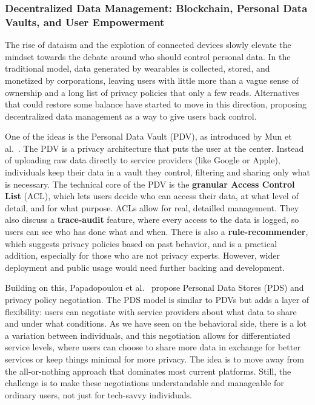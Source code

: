 	\subsubsection{Decentralized Data Management: Blockchain, Personal Data Vaults, and User Empowerment}

	The rise of dataism and the explotion of connected devices slowly elevate the mindset towards the debate around who should control personal data. In the traditional model, data generated by wearables is collected, stored, and monetized by corporations, leaving users with little more than a vague sense of ownership and a long list of privacy policies that only a few reads. Alternatives that could restore some balance have started to move in this direction, proposing decentralized data management as a way to give users back control.

	One of the ideas is the Personal Data Vault (PDV), as introduced by Mun et al.~\cite{Mun2010}. The PDV is a privacy architecture that puts the user at the center. Instead of uploading raw data directly to service providers (like Google or Apple), individuals keep their data in a vault they control, filtering and sharing only what is necessary. The technical core of the PDV is the \textbf{granular Access Control List} (ACL), which lets users decide who can access their data, at what level of detail, and for what purpose. ACLs allow for real, detailled management. They also discuss a \textbf{trace-audit} feature, where every access to the data is logged, so users can see who has done what and when. There is also a \textbf{rule-recommender}, which suggests privacy policies based on past behavior, and is a practical addition, especially for those who are not privacy experts. However, wider deployment and public usage would need further backing and development.

	Building on this, Papadopoulou et al.~\cite{Papadopoulou2015} propose Personal Data Stores (PDS) and privacy policy negotiation. The PDS model is similar to PDVs but adds a layer of flexibility: users can negotiate with service providers about what data to share and under what conditions. As we have seen on the behavioral side, there is a lot a variation between individuals, and this negotiation allows for differentiated service levels, where users can choose to share more data in exchange for better services or keep things minimal for more privacy. The idea is to move away from the all-or-nothing approach that dominates most current platforms. Still, the challenge is to make these negotiations understandable and manageable for ordinary users, not just for tech-savvy individuals.

